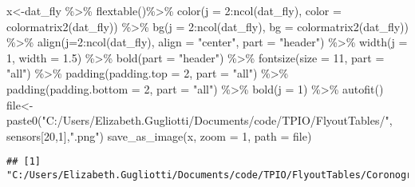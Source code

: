 \documentclass[
]{article}
\newenvironment{Shaded}{\begin{snugshade}}{\end{snugshade}}
\newcommand{\AttributeTok}[1]{\textcolor[rgb]{0.77,0.63,0.00}{#1}}
\newcommand{\DecValTok}[1]{\textcolor[rgb]{0.00,0.00,0.81}{#1}}
\newcommand{\FloatTok}[1]{\textcolor[rgb]{0.00,0.00,0.81}{#1}}
\newcommand{\FunctionTok}[1]{\textcolor[rgb]{0.00,0.00,0.00}{#1}}
\newcommand{\NormalTok}[1]{#1}
\newcommand{\OtherTok}[1]{\textcolor[rgb]{0.56,0.35,0.01}{#1}}
\newcommand{\SpecialCharTok}[1]{\textcolor[rgb]{0.00,0.00,0.00}{#1}}
\newcommand{\StringTok}[1]{\textcolor[rgb]{0.31,0.60,0.02}{#1}}
\begin{document}
\begin{Shaded}
\begin{Highlighting}[]
\NormalTok{x}\OtherTok{\textless{}{-}}\NormalTok{dat\_fly }\SpecialCharTok{\%\textgreater{}\%}
    \FunctionTok{flextable}\NormalTok{()}\SpecialCharTok{\%\textgreater{}\%}
    \FunctionTok{color}\NormalTok{(}\AttributeTok{j =} \DecValTok{2}\SpecialCharTok{:}\FunctionTok{ncol}\NormalTok{(dat\_fly), }\AttributeTok{color =} \FunctionTok{colormatrix2}\NormalTok{(dat\_fly)) }\SpecialCharTok{\%\textgreater{}\%}
    \FunctionTok{bg}\NormalTok{(}\AttributeTok{j =} \DecValTok{2}\SpecialCharTok{:}\FunctionTok{ncol}\NormalTok{(dat\_fly), }\AttributeTok{bg =} \FunctionTok{colormatrix2}\NormalTok{(dat\_fly)) }\SpecialCharTok{\%\textgreater{}\%}
    \FunctionTok{align}\NormalTok{(}\AttributeTok{j=}\DecValTok{2}\SpecialCharTok{:}\FunctionTok{ncol}\NormalTok{(dat\_fly), }\AttributeTok{align =} \StringTok{"center"}\NormalTok{, }\AttributeTok{part =} \StringTok{"header"}\NormalTok{) }\SpecialCharTok{\%\textgreater{}\%}
    \FunctionTok{width}\NormalTok{(}\AttributeTok{j =} \DecValTok{1}\NormalTok{, }\AttributeTok{width =} \FloatTok{1.5}\NormalTok{) }\SpecialCharTok{\%\textgreater{}\%}
    \FunctionTok{bold}\NormalTok{(}\AttributeTok{part =} \StringTok{"header"}\NormalTok{) }\SpecialCharTok{\%\textgreater{}\%}
    \FunctionTok{fontsize}\NormalTok{(}\AttributeTok{size =} \DecValTok{11}\NormalTok{, }\AttributeTok{part =} \StringTok{"all"}\NormalTok{) }\SpecialCharTok{\%\textgreater{}\%}
    \FunctionTok{padding}\NormalTok{(}\AttributeTok{padding.top =} \DecValTok{2}\NormalTok{, }\AttributeTok{part =} \StringTok{"all"}\NormalTok{) }\SpecialCharTok{\%\textgreater{}\%}
    \FunctionTok{padding}\NormalTok{(}\AttributeTok{padding.bottom =} \DecValTok{2}\NormalTok{, }\AttributeTok{part =} \StringTok{"all"}\NormalTok{) }\SpecialCharTok{\%\textgreater{}\%}
    \FunctionTok{bold}\NormalTok{(}\AttributeTok{j =} \DecValTok{1}\NormalTok{) }\SpecialCharTok{\%\textgreater{}\%} \FunctionTok{autofit}\NormalTok{()}
\NormalTok{file}\OtherTok{\textless{}{-}}\FunctionTok{paste0}\NormalTok{(}\StringTok{"C:/Users/Elizabeth.Gugliotti/Documents/code/TPIO/FlyoutTables/"}\NormalTok{, sensors[}\DecValTok{20}\NormalTok{,}\DecValTok{1}\NormalTok{],}\StringTok{".png"}\NormalTok{)}
\FunctionTok{save\_as\_image}\NormalTok{(x, }\AttributeTok{zoom =} \DecValTok{1}\NormalTok{, }\AttributeTok{path =}\NormalTok{ file)}
\end{Highlighting}
\end{Shaded}

\begin{verbatim}
## [1] "C:/Users/Elizabeth.Gugliotti/Documents/code/TPIO/FlyoutTables/Coronograph.png"
\end{verbatim}
\end{document}
